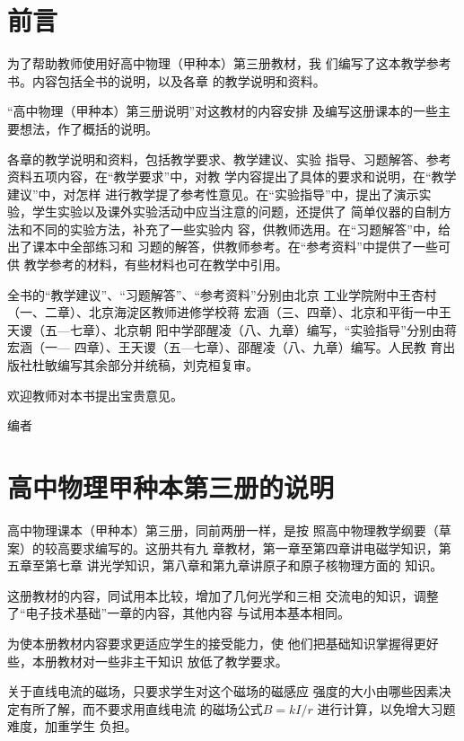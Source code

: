 \chapter{前言}
为了帮助教师使用好高中物理（甲种本）第三册教材，我
们编写了这本教学参考书。内容包括全书的说明，以及各章
的教学说明和资料。

“高中物理（甲种本）第三册说明”对这教材的内容安排
及编写这册课本的一些主要想法，作了概括的说明。

各章的教学说明和资料，包括教学要求、教学建议、实验
指导、习题解答、参考资料五项内容，在“教学要求”中，对教
学内容提出了具体的要求和说明，在“教学建议”中，对怎样
进行教学提了参考性意见。在“实验指导”中，提出了演示实
验，学生实验以及课外实验活动中应当注意的问题，还提供了
简单仪器的自制方法和不同的实验方法，补充了一些实验内
容，供教师选用。在“习题解答”中，给出了课本中全部练习和
习题的解答，供教师参考。在“参考资料”中提供了一些可供
教学参考的材料，有些材料也可在教学中引用。

全书的“教学建议”、“习题解答”、“参考资料”分别由北京
工业学院附中王杏村（一、二章）、北京海淀区教师进修学校蒋
宏涵（三、四章）、北京和平街一中王天谡（五—七章）、北京朝
阳中学邵醒凌（八、九章）编写，“实验指导”分别由蒋宏涵（一—
四章）、王天谡（五—七章）、邵醒凌（八、九章）编写。人民教
育出版社杜敏编写其余部分并统稿，刘克桓复审。

欢迎教师对本书提出宝贵意见。

\begin{flushright}
    编者
\end{flushright}


\chapter{高中物理甲种本第三册的说明}

高中物理课本（甲种本）第三册，同前两册一样，是按
照高中物理教学纲要（草案）的较高要求编写的。这册共有九
章教材，第一章至第四章讲电磁学知识，第五章至第七章
讲光学知识，第八章和第九章讲原子和原子核物理方面的
知识。

这册教材的内容，同试用本比较，增加了几何光学和三相
交流电的知识，调整了“电子技术基础”一章的内容，其他内容
与试用本基本相同。

为使本册教材内容要求更适应学生的接受能力，使
他们把基础知识掌握得更好些，本册教材对一些非主干知识
放低了教学要求。

关于直线电流的磁场，只要求学生对这个磁场的磁感应
强度的大小由哪些因素决定有所了解，而不要求用直线电流
的磁场公式$B=kI/r$
进行计算，以免增大习题难度，加重学生
负担。

